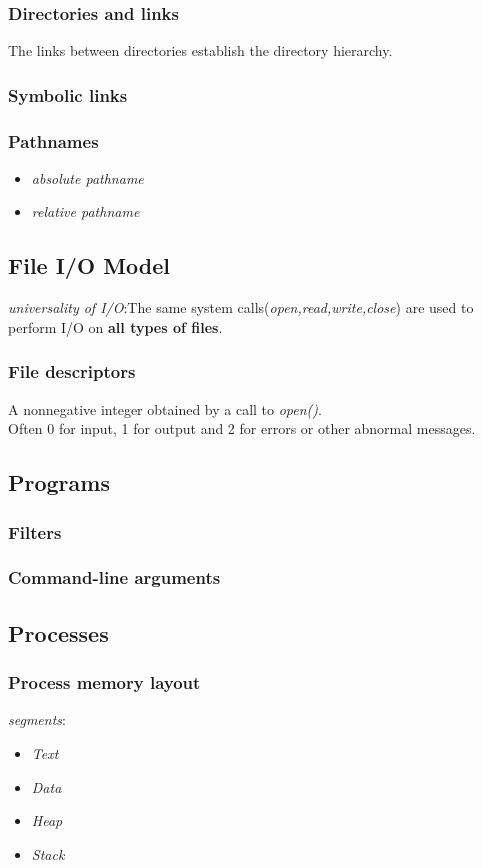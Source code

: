 \documentclass{article}
\begin{document}
\subsubsection*{Directories and links}
The links between directories establish the directory hierarchy.
\subsubsection*{Symbolic links}
\subsubsection*{Pathnames}
\begin{itemize}
\item \textit{absolute pathname}
\item \textit{relative pathname}
\end{itemize}

\subsection{File I/O Model}
\par\textit{universality of I/O}:The same system calls(\textit{open,read,write,close}) are used to perform I/O on \textbf{all types of files}.
\subsubsection*{File descriptors}
A nonnegative integer obtained by a call to \textit{open()}.\\
Often 0 for input, 1 for output and 2 for errors or other abnormal messages.
\subsection{Programs}
\subsubsection*{Filters}
\subsubsection*{Command-line arguments}

\subsection{Processes}
\subsubsection*{Process memory layout}
\textit{segments}:
\begin{itemize}
\item \textit{Text}
\item \textit{Data}
\item \textit{Heap}
\item \textit{Stack}
\end{itemize}
\end{document}
